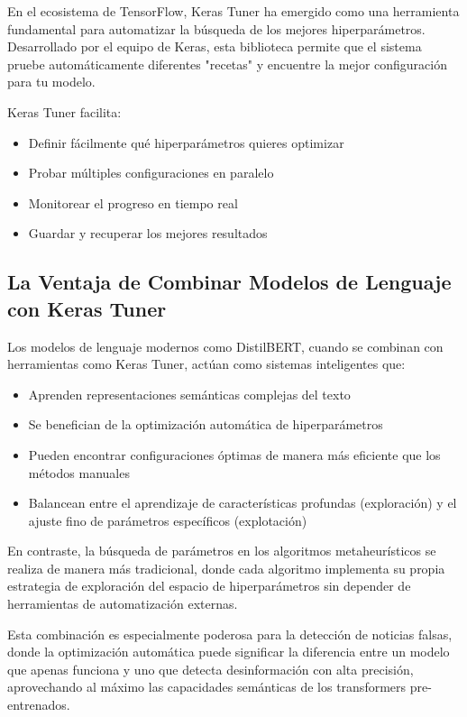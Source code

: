 En el ecosistema de TensorFlow, Keras Tuner \cite{omalley2020hyperparameter} ha emergido como una herramienta fundamental para automatizar la búsqueda de los mejores hiperparámetros. Desarrollado por el equipo de Keras, esta biblioteca permite que el sistema pruebe automáticamente diferentes "recetas" y encuentre la mejor configuración para tu modelo.

Keras Tuner facilita:
\begin{itemize}
    \item Definir fácilmente qué hiperparámetros quieres optimizar
    \item Probar múltiples configuraciones en paralelo
    \item Monitorear el progreso en tiempo real
    \item Guardar y recuperar los mejores resultados
\end{itemize}

\subsection{La Ventaja de Combinar Modelos de Lenguaje con Keras Tuner}

Los modelos de lenguaje modernos como DistilBERT, cuando se combinan con herramientas como Keras Tuner, actúan como sistemas inteligentes que:

\begin{itemize}
    \item Aprenden representaciones semánticas complejas del texto
    \item Se benefician de la optimización automática de hiperparámetros
    \item Pueden encontrar configuraciones óptimas de manera más eficiente que los métodos manuales
    \item Balancean entre el aprendizaje de características profundas (exploración) y el ajuste fino de parámetros específicos (explotación)
\end{itemize}

En contraste, la búsqueda de parámetros en los algoritmos metaheurísticos se realiza de manera más tradicional, donde cada algoritmo implementa su propia estrategia de exploración del espacio de hiperparámetros sin depender de herramientas de automatización externas.

Esta combinación es especialmente poderosa para la detección de noticias falsas, donde la optimización automática puede significar la diferencia entre un modelo que apenas funciona y uno que detecta desinformación con alta precisión, aprovechando al máximo las capacidades semánticas de los transformers pre-entrenados.

